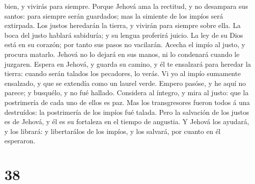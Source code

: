 bien, y vivirás para siempre.  Porque Jehová ama la
rectitud, y no desampara sus santos: para siempre serán guardados; mas
la simiente de los impíos será extirpada.  Los justos
heredarán la tierra, y vivirán para siempre sobre ella. 
La boca del justo hablará sabiduría; y su lengua proferirá juicio.
 La ley de su Dios está en su corazón; por tanto sus
pasos no vacilarán.  Acecha el impío al justo, y procura
matarlo.  Jehová no lo dejará en sus manos, ni lo
condenará cuando le juzgaren.  Espera en Jehová, y guarda
su camino, y él te ensalzará para heredar la tierra: cuando serán
talados los pecadores, lo verás.  Vi yo al impío
sumamente ensalzado, y que se extendía como un laurel verde.
 Empero pasóse, y he aquí no parece; y busquélo, y no fué
hallado.  Considera al íntegro, y mira al justo: que la
postrimería de cada uno de ellos es paz.  Mas los
transgresores fueron todos á una destruídos: la postrimería de los
impíos fué talada.  Pero la salvación de los justos es de
Jehová, y él es su fortaleza en el tiempo de angustia.  Y
Jehová los ayudará, y los librará: y libertarálos de los impíos, y los
salvará, por cuanto en él esperaron.

\hypertarget{section-37}{%
\section{38}\label{section-37}}

